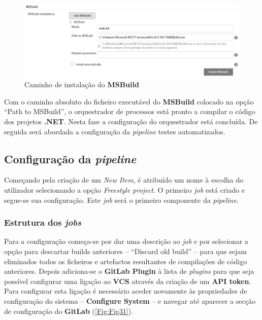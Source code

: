 \begin{figure}[hbt!]
\centering
\includegraphics[width=0.9\linewidth]{Cap5/JenkinsGlobalToolConfiguration.png}
\caption{Caminho de instalação do \textbf{MSBuild}}
\label{Fig:Fig30}
\end{figure}

\hspace{1cm}Com o caminho absoluto do ficheiro executável do \textbf{MSBuild} colocado na opção ``Path to MSBuild'', o orquestrador de processos está pronto a compilar o código dos projetos \textbf{.NET}. Nesta fase a configuração do orquestrador está concluída. De seguida será abordada a configuração da \textit{pipeline} testes automatizados.

\subsection{Configuração da \textit{pipeline}}

\hspace{1cm}Começando pela criação de um \textit{New Item}, é atribuído um nome à escolha do utilizador selecionando a opção \textit{Freestyle project}. O primeiro \textit{job} está criado e segue-se sua configuração. Este \textit{job} será o primeiro componente da \textit{pipeline}.

\subsubsection{Estrutura dos \textit{jobs}}

\hspace{1cm}Para a configuração começa-se por dar uma descrição ao \textit{job} e por selecionar a opção para descartar builds anteriores -- ``Discard old build'' -- para que sejam eliminados todos os ficheiros e artefactos resultantes de compilações de código anteriores. Depois adiciona-se o \textbf{GitLab Plugin} à lista de \textit{plugins} para que seja possível configurar uma ligação ao \textbf{VCS} através da criação de um \textbf{API token}. Para configurar esta ligação é necessário aceder novamente às propriedades de configuração do sistema -- \textbf{Configure System} -- e navegar até aparecer a secção de configuração do \textbf{GitLab} (\ref{Fig:Fig31}).

